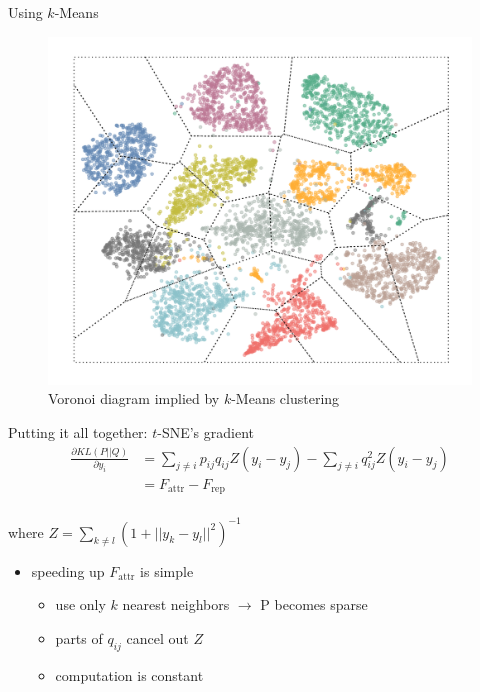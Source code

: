 \documentclass{beamer}
\begin{document}
\begin{frame}[fragile]{Using $k$-Means}
    \begin{figure}[h]
        \centering
        \includegraphics[width=.6\textwidth]{voronoi}
        \caption{Voronoi diagram implied by $k$-Means clustering}
    \end{figure}
\end{frame}

\begin{frame}[fragile]{Putting it all together: $t$-SNE's gradient}
    \begin{align*}
        \frac{\partial KL(P||Q)}{\partial y_i} &= \sum_{j \neq i} p_{ij}q_{ij}Z(y_i - y_j) - \sum_{j \neq i} q_{ij}^2Z(y_i - y_j) \\
        &= F_\text{attr} - F_\text{rep} \\
    \end{align*}

    \vspace{-2em}
    \quad where $Z = \sum_{k \neq l} (1 + || y_k - y_l||^2)^{-1}$

    \begin{itemize}
        \item speeding up $F_\text{attr}$ is simple
            \begin{itemize}
                \item use only $k$ nearest neighbors $\rightarrow$ P becomes sparse
                \item parts of $q_{ij}$ cancel out $Z$
                \item computation is constant
            \end{itemize}
    \end{itemize}
\end{frame}
\end{document}

